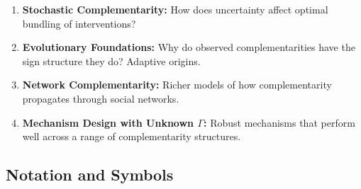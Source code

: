 \begin{enumerate}
    \item \textbf{Stochastic Complementarity:} How does uncertainty affect 
    optimal bundling of interventions?
    
    \item \textbf{Evolutionary Foundations:} Why do observed complementarities 
    have the sign structure they do? Adaptive origins.
    
    \item \textbf{Network Complementarity:} Richer models of how complementarity 
    propagates through social networks.
    
    \item \textbf{Mechanism Design with Unknown $\Gamma$:} Robust mechanisms 
    that perform well across a range of complementarity structures.
\end{enumerate}



\subsection{Notation and Symbols}
\label{sec:B-notation}

